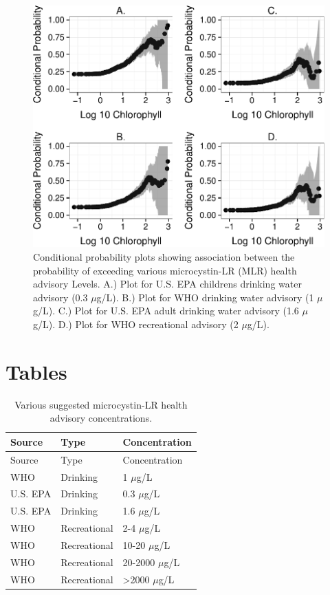 \documentclass[11pt,]{article}
\begin{document}
\begin{figure}[htbp]
\centering
\includegraphics{manuscript_files/figure-latex/epa_child_cp_plot-1.pdf}
\caption{Conditional probability plots showing association between the
probability of exceeding various microcystin-LR (MLR) health advisory
Levels. A.) Plot for U.S. EPA childrens drinking water advisory (0.3
\(\mu\)g/L). B.) Plot for WHO drinking water advisory (1 \(\mu\)g/L).
C.) Plot for U.S. EPA adult drinking water advisory (1.6 \(\mu\)g/L).
D.) Plot for WHO recreational advisory (2 \(\mu\)g/L).
\label{fig:multi_cp_plot}}
\end{figure}

\newpage

\section{Tables}\label{tables}

\begin{longtable}[c]{@{}lll@{}}
\caption{Various suggested microcystin-LR health advisory
concentrations. \label{tab:microcystin_levels}}\tabularnewline
\toprule
Source & Type & Concentration\tabularnewline
\midrule
\endfirsthead
\toprule
Source & Type & Concentration\tabularnewline
\midrule
\endhead
WHO & Drinking & 1 \(\mu\)g/L\tabularnewline
U.S. EPA & Drinking & 0.3 \(\mu\)g/L\tabularnewline
U.S. EPA & Drinking & 1.6 \(\mu\)g/L\tabularnewline
WHO & Recreational & 2-4 \(\mu\)g/L\tabularnewline
WHO & Recreational & 10-20 \(\mu\)g/L\tabularnewline
WHO & Recreational & 20-2000 \(\mu\)g/L\tabularnewline
WHO & Recreational & \textgreater{}2000 \(\mu\)g/L\tabularnewline
\bottomrule
\end{longtable}
\end{document}
